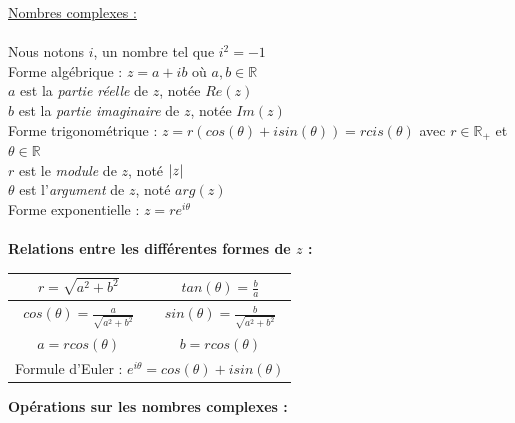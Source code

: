 \documentclass[12pt, letterpaper]{article}
\begin{document}
\newpage
\underline{Nombres complexes :}
\\
\\
Nous notons $i$, un nombre tel que $i^2 = -1$
\\
Forme algébrique : $z = a+ib$ où $a,b \in \mathbb{R}$
\\
\hspace*{2em}$a$ est la \textit{partie réelle} de $z$, notée $Re(z)$
\\
\hspace*{2em}$b$ est la \textit{partie imaginaire} de $z$, notée $Im(z)$
\\
Forme trigonométrique : $z = r (cos(\theta)+i sin(\theta)) = r cis(\theta)$ avec $r \in \mathbb{R}_+$ et $\theta \in \mathbb{R}$
\\
\hspace*{2em}$r$ est le \textit{module} de $z$, noté $\abs{z}$
\\
\hspace*{2em}$\theta$ est l'\textit{argument} de $z$, noté $arg(z)$
\\
Forme exponentielle : $z = re^{i\theta}$
\\
\\
\textbf{Relations entre les différentes formes de $z$ :}
    \begin{center}
        \begin{tabular}{|c|c|}
        \hline
        \rule{0pt}{1.2em}
        $r = \sqrt{a^2+b^2}$ & $tan(\theta) = \frac{b}{a}$ \\[2pt]
        \hline
        \rule{0pt}{1.2em}
        $cos(\theta) = \frac{a}{\sqrt{a^2+b^2}}$ & $sin(\theta) = \frac{b}{\sqrt{a^2+b^2}}$ \\[2pt]
        \hline
        \rule{0pt}{1.2em}
        $a = rcos(\theta)$ & $b = rcos(\theta)$\\[2pt]
        \hline
        \multicolumn{2}{|c|}{\rule{0pt}{1.2em}Formule d'Euler : $e^{i\theta} = cos(\theta) + i sin(\theta)$} \\  %
        \hline
        \end{tabular}
    \end{center}
\textbf{Opérations sur les nombres complexes :}
\end{document}
